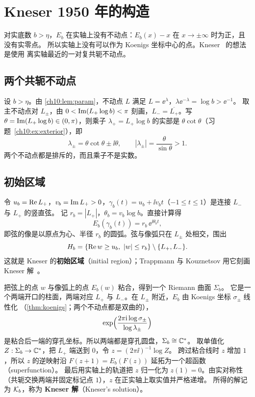 \section{Kneser 1950 年的构造}\label{ch10:sec:kneser}

对实底数 $b>\eta$，$E_b$ 在实轴上没有不动点：$E_b(x)-x$ 在 $x\to\pm\infty$ 时为正，且没有实零点。
所以实轴上没有可以作为 Koenigs 坐标中心的点。Kneser~\cite{Kneser1950} 的想法是使用
离实轴最近的一对复共轭不动点。

\subsection{两个共轭不动点}

设 $b>\eta$。由 \cref{ch10:lem:param}，不动点 $L$ 满足 $L=\ee^\lambda$，$\lambda\ee^{-\lambda}=\log b>\ee^{-1}$。
取主不动点对 $L_\pm$，由 $0<\operatorname{Im}(L_+\log b)<\pi$ 刻画，$L_-=\overline{L_+}$。写
$\theta=\operatorname{Im}(L_+\log b)\in(0,\pi)$，则乘子 $\lambda_+=L_+\log b$ 的实部是 $\theta\cot\theta$（习题~\ref{ch10:ex:exterior}），即
\begin{equation}\label{ch10:eq:exterior-multiplier}
  \lambda_\pm=\theta\cot\theta\pm\ii\theta,\qquad |\lambda_\pm|=\frac{\theta}{\sin\theta}>1 .
\end{equation}
两个不动点都是排斥的，而且乘子不是实数。

\subsection{初始区域}

令 $u_b=\operatorname{Re} L_+$，$v_b=\operatorname{Im} L_+>0$，$\gamma_b(t)=u_b+\ii v_bt$（$-1\le t\le1$）是连接 $L_-$ 与 $L_+$ 的竖直弦。
记 $r_b=|L_+|$，$\theta_b=v_b\log b$。直接计算得
\[
  E_b(\gamma_b(t))=r_b\,\ee^{\ii\theta_bt},
\]
即弦的像是以原点为心、半径 $r_b$ 的圆弧。弦与像弧只在 $L_\pm$ 处相交，围出
\begin{equation}\label{ch10:eq:initial-region}
  H_b=\{\operatorname{Re} w\ge u_b,\ |w|\le r_b\}\setminus\{L_+,L_-\} .
\end{equation}
这就是 Kneser 的\textbf{初始区域}（initial region）；Trappmann 与 Kouznetsov 用它刻画 Kneser 解~\cite{TrappmannKouznetsov2011}。

把弦上的点 $w$ 与像弧上的点 $E_b(w)$ 粘合，得到一个 Riemann 曲面 $\Sigma_b$。
它是一个两端开口的柱面，两端对应 $L_+$ 与 $L_-$。在 $L_\pm$ 附近，$E_b$ 由 Koenigs 坐标 $\sigma_\pm$ 线性化
（\cref{thm:koenigs}；两个不动点都是双曲的），
\[
  \exp\Bigl(\frac{2\pi\mathrm{i}\log\sigma_\pm}{\log\lambda_\pm}\Bigr)
\]
是粘合后一端的穿孔坐标。所以两端都是穿孔圆盘，$\Sigma_b\cong\mathbb{C}^*$。
取单值化 $Z:\Sigma_b\to\mathbb{C}^*$，把 $L_+$ 端送到 $0$，令 $z=(2\pi\ii)^{-1}\log Z$。
跨过粘合线时 $z$ 增加 $1$，所以 $z$ 的逆映射沿 $F(z+1)=E_b(F(z))$ 延拓为一个超函数（superfunction）。
最后用实轴上的轨道把 $z$ 归一化为 $z(1)=0$。由实对称性（共轭交换两端并固定标记点 $1$），$z$ 在正实轴上取实值并严格递增。
所得的解记为 $\mathcal K_b$，称为 \textbf{Kneser 解}（Kneser's solution）。

